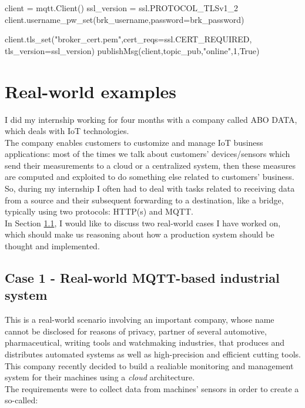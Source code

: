 \documentclass[12pt]{report}
\begin{document}
{\begin{python}
client = mqtt.Client()
ssl_version = ssl.PROTOCOL_TLSv1_2
client.username_pw_set(brk_username,password=brk_password)

client.tls_set("broker_cert.pem",cert_reqs=ssl.CERT_REQUIRED,  tls_version=ssl_version)
publishMsg(client,topic_pub,"online",1,True)
\end{python}


\chapter{Real-world examples}
\bigskip
I did my internship working for four months with a company called ABO DATA, which deals with IoT technologies.\\
The company enables customers to customize and manage IoT business applications: most of the times we talk about customers' devices/sensors which send their measurements to a cloud or a centralized system, then these measures are computed and exploited to do something else related to customers' business.\\
So, during my internship I often had to deal with tasks related to receiving data from a source and their subsequent forwarding to a destination, like a bridge, typically using two protocols: HTTP(s) and MQTT.\\

In Section \ref{sec:intership_case1}, I would like to discuss two real-world cases I have worked on, which should make us reasoning about how a production system should be thought and implemented.\\

\clearpage
\section{Case 1 - Real-world MQTT-based industrial system}
\label{sec:intership_case1}
\bigskip
This is a real-world scenario involving an important company, whose name cannot be disclosed for reasons of privacy, partner of several automotive, pharmaceutical, writing tools and watchmaking industries, that produces and distributes automated systems as well as high-precision and efficient cutting tools.\\

This company recently decided to build a realiable monitoring and management system for their machines using a \emph{cloud} architecture.\\
The requirements were to collect data from machines' sensors in order to create a so-called:

}
\end{document}
